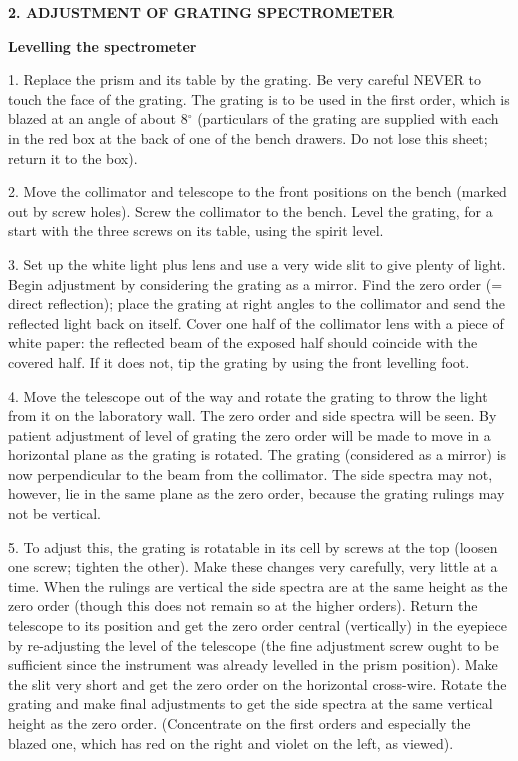 \documentclass[12pt]{article}
\begin{document}
\newpage

{\bf 2. ADJUSTMENT OF GRATING SPECTROMETER}

{\bf Levelling the spectrometer}

1. Replace the prism and its table by the grating.  Be very careful
NEVER to touch the  face of the grating.  The grating is to be used
in the first order, which is blazed at  an angle of about 8$^\circ$
(particulars of the grating are supplied with each in the red box  at
the back of one of the bench drawers.  Do not lose this sheet; return
it to the box).

2. Move the collimator and telescope to the front positions on the
bench (marked out  by screw holes).  Screw the collimator to the
bench.  Level the grating, for a start  with the three screws on its
table, using the spirit level.

3. Set up the white light plus lens and use a very wide slit to give
plenty of light.  Begin  adjustment by considering the grating as a
mirror.  Find the zero order (= direct  reflection); place the grating
at right angles to the collimator and send the reflected  light back
on itself.  Cover one half of the collimator lens with a piece of
white  paper: the reflected beam of the exposed half should coincide
with the covered half.   If it does not, tip the grating by using the
front levelling foot.

4. Move the telescope out of the way and rotate the grating to throw
the light from it  on the laboratory wall.  The zero order and side
spectra will be seen.  By patient  adjustment of level of grating the
zero order will be made to move in a horizontal  plane as the grating
is rotated.  The grating (considered as a mirror) is now
perpendicular to the beam from the collimator.  The side spectra may
not, however,  lie in the same plane as the zero order, because the
grating rulings may not be  vertical.

5. To adjust this, the grating is rotatable in its cell by screws at
the top (loosen one  screw; tighten the other).  Make these changes
very carefully, very little at a time.   When the rulings are vertical
the side spectra are at the same height as the zero  order (though
this does not remain so at the higher orders).  Return the telescope
to  its position and get the zero order central (vertically) in the
eyepiece by re-adjusting  the level of the telescope (the fine
adjustment screw ought to be sufficient since the  instrument was
already levelled in the prism position).  Make the slit very short and
get the zero order on the horizontal cross-wire.  Rotate the grating
and make final  adjustments to get the side spectra at the same
vertical height as the zero order.   (Concentrate on the first orders
and especially the blazed one, which has red on the  right and violet
on the left, as viewed).
\end{document}
